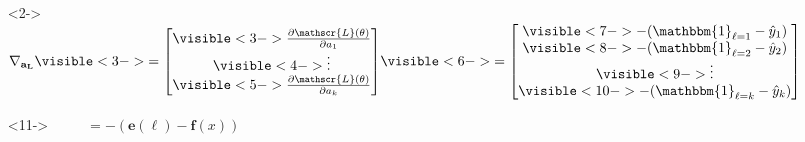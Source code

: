 \begin{frame}
\begin{columns}
\begin{overlayarea}{\textwidth}{\textheight}
      \vspace{0.42cm}
      \begin{itemize}
        \item[]<2-> $\mathbf{\nabla_{a_{L}}} \visible<3->{ =
                \begin{bmatrix}
                  \visible<3->{\frac{\partial \mathscr{L}(\theta)}{\partial a_1}}   \\
                  \visible<4->{\vdots}                                              \\
                  \visible<5->{\frac{\partial \mathscr{L}(\theta)}{\partial a_k}} \\
                \end{bmatrix} }
              \visible<6->{ = \begin{bmatrix}
                  \visible<7->{ - (\mathbbm{1}_{\ell = 1} - \hat{y}_1)}       \\
                  \visible<8->{- (\mathbbm{1}_{\ell = 2} - \hat{y}_2)}        \\
                  \visible<9->{\vdots}                                     \\
                  \visible<10->{- (\mathbbm{1}_{\ell = k} - \hat{y}_{k})} \\
                \end{bmatrix} }$
        \item[]<11-> $\hspace{1cm}= - (\mathbf{e}(\ell) - \mathbf{f}(x))$
      \end{itemize}
    \end{overlayarea}
    \begin{overlayarea}{\textwidth}{\textheight}
      \makebox[\textwidth][c]{\usebox{\nnoutputtwocontent}}
    \end{overlayarea}
  \end{columns}
\end{frame}